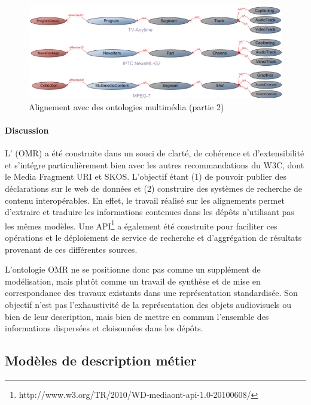 \begin{figure}[ht!]
\centering
\includegraphics[width=\textwidth]{images/MA-alignement-B.png}
\caption{Alignement avec des ontologies multimédia (partie 2)}
\label{img:ma-alignement-B}
\end{figure}

\paragraph{Discussion}
L' (OMR) a été construite dans un souci de clarté, de cohérence et d'extensibilité et s'intégre particulièrement bien avec les autres recommandations du W3C, dont le Media Fragment URI et SKOS.
L'objectif étant (1) de pouvoir publier des déclarations sur le web de données et (2) construire des systèmes de recherche de contenu interopérables. 
En effet, le travail réalisé sur les alignements permet d'extraire et traduire les informations contenues dans les dépôts n'utilisant pas les mêmes modèles.
Une API\footnote{http://www.w3.org/TR/2010/WD-mediaont-api-1.0-20100608/} a également été construite pour faciliter ces opérations et le déploiement de service de recherche et d'aggrégation de résultats provenant de ces différentes sources.

L'ontologie OMR ne se positionne donc pas comme un supplément de modélisation, mais plutôt comme un travail de synthèse et de mise en correspondance des travaux existants dans une représentation standardisée.
Son objectif n'est pas l'exhaustivité de la représentation des objets audiovisuels ou bien de leur description, mais bien de mettre en commun l'ensemble des informations dispersées et cloisonnées dans les dépôts.







\subsection{Modèles de description métier }\label{sec:plan}

